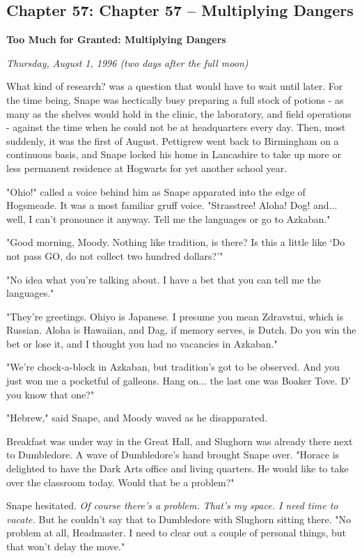 \documentclass[a4paper,11pt]{article}
\begin{document}
\subsection{Chapter 57: Chapter 57 – Multiplying Dangers}

\textbf{Too Much for Granted: Multiplying Dangers}

\emph{Thursday, August 1, 1996 (two days after the full moon)}

What kind of research? was a question that would have to wait until later. For the time being, Snape was hectically busy preparing a full stock of potions - as many as the shelves would hold in the clinic, the laboratory, and field operations - against the time when he could not be at headquarters every day. Then, most suddenly, it was the first of August. Pettigrew went back to Birmingham on a continuous basis, and Snape locked his home in Lancashire to take up more or less permanent residence at Hogwarts for yet another school year.

"Ohio!" called a voice behind him as Snape apparated into the edge of Hogsmeade. It was a most familiar gruff voice. "Strasstree! Aloha! Dog! and... well, I can't pronounce it anyway. Tell me the languages or go to Azkaban."

"Good morning, Moody. Nothing like tradition, is there? Is this a little like `Do not pass GO, do not collect two hundred dollars?'"

"No idea what you're talking about. I have a bet that you can tell me the languages."

"They're greetings. Ohiyo is Japanese. I presume you mean Zdravstui, which is Russian. Aloha is Hawaiian, and Dag, if memory serves, is Dutch. Do you win the bet or lose it, and I thought you had no vacancies in Azkaban."

"We're chock-a-block in Azkaban, but tradition's got to be observed. And you just won me a pocketful of galleons. Hang on... the last one was Boaker Tove. D' you know that one?"

"Hebrew," said Snape, and Moody waved as he disapparated.

Breakfast was under way in the Great Hall, and Slughorn was already there next to Dumbledore. A wave of Dumbledore's hand brought Snape over. "Horace is delighted to have the Dark Arts office and living quarters. He would like to take over the classroom today. Would that be a problem?"

Snape hesitated. \emph{Of course there's a problem. That's my space. I need time to vacate.} But he couldn't say that to Dumbledore with Slughorn sitting there. "No problem at all, Headmaster. I need to clear out a couple of personal things, but that won't delay the move."
\end{document}

